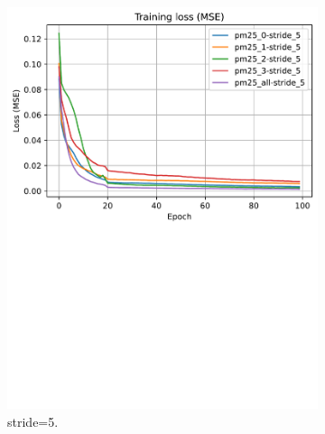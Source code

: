 \begin{figure}[!htbp]
\begin{subfigure}[!htbp]{.45\textwidth}
        \includegraphics[width=\textwidth]{fig/results/train_curves_stride_5.pdf}
        \caption{stride=5.}
        \label{fig:train_stride_5}
    \end{subfigure}
    \begin{subfigure}[!htbp]{.45\textwidth}
        \centering

\end{subfigure}
\end{figure}
